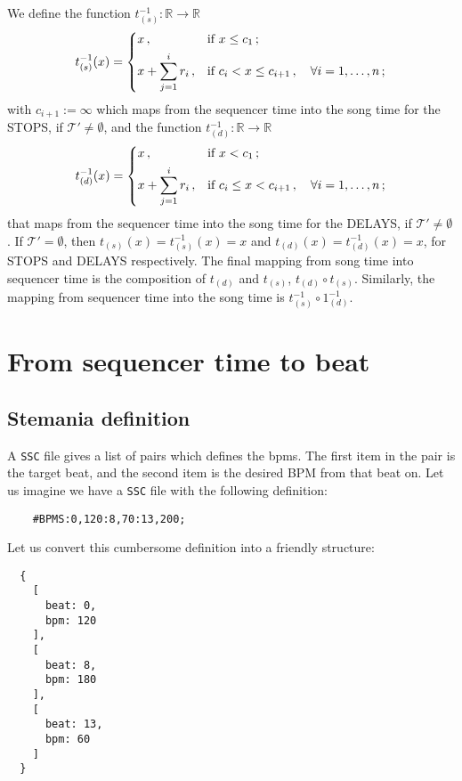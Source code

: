 \documentclass[a4paper,9pt]{article}
\begin{document}
We define the function $ t_{(s)}^{-1}: \mathbb{R}\rightarrow \mathbb{R} $
\begin{equation}
	t_{(s)}^{-1}(x) = \begin{dcases}
		x\,, & \text{if $ x \leq c_1 $}\,;\\
		x+ \sum_{j=1}^{i}r_i\,, & \text{if $ c_i < x \leq c_{i+1}\,,\quad \forall i=1,\dots,n$}\,;\\
	\end{dcases}
	\label{eq:t-1s}
\end{equation}
with $ c_{i+1} := \infty $ which maps from the sequencer time into the song time for the STOPS, if $ \mathcal{T'} \neq \emptyset $, and the function $ t_{(d)}^{-1}: \mathbb{R}\rightarrow \mathbb{R} $
\begin{equation}
	t_{(d)}^{-1}(x) = \begin{dcases}
		x\,, & \text{if $ x < c_1 $}\,;\\
		x+ \sum_{j=1}^{i}r_i\,, & \text{if $ c_i \leq x < c_{i+1}\,,\quad \forall i=1,\dots,n$}\,;\\
	\end{dcases}
	\label{eq:t-1s}
\end{equation}
that maps from the sequencer time into the song time for the DELAYS, if $ \mathcal{T'}\neq \emptyset $. If $ \mathcal{T'} = \emptyset $, then $ t_{(s)}(x) = t_{(s)}^{-1}(x) = x$ and $t_{(d)}(x) = t_{(d)}^{-1} (x) = x $, for STOPS and DELAYS respectively.
The final mapping from song time into sequencer time is the composition of $t_{(d)}$ and $ t_{(s)} $, $ t_{(d)}\circ t_{(s)} $. Similarly, the mapping from sequencer time into the song time is $ t_{(s)}^{-1}\circ 1_{(d)}^{-1} $.
    \section{From sequencer time to beat}

    \subsection{Stemania definition}\label{sec:stepmania-definition-time2beat}
    
    A \texttt{SSC} file gives a list of pairs which defines the bpms. The first item in the pair is the target beat, and the second item is the desired BPM from that beat on. Let us imagine we have a \texttt{SSC} file with the following definition:
    \begin{verbatim}
    #BPMS:0,120:8,70:13,200;     
    \end{verbatim}
    Let us convert this cumbersome definition into a friendly structure:
    \begin{verbatim}
  {
    [
      beat: 0,
      bpm: 120
    ],
    [
      beat: 8,
      bpm: 180 
    ],
    [
      beat: 13,
      bpm: 60 
    ]
  }
    \end{verbatim}
\end{document}
